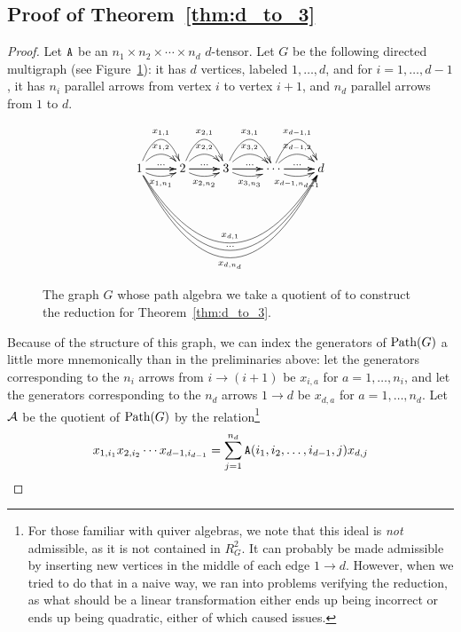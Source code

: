 \documentclass[11pt]{article}
\begin{document}
\subsection{Proof of Theorem~\ref{thm:d_to_3}}
\begin{proof}
Let $\mathtt{A}$ be an $n_1 \times n_2 \times \dotsb \times n_d$ $d$-tensor. Let $G$ be the following directed multigraph (see Figure~\ref{fig:graph}): it has $d$ vertices, labeled $1,\dotsc,d$, and for $i=1,\dotsc,d-1$, it has $n_i$ parallel arrows from vertex $i$ to vertex $i+1$, and $n_d$ parallel arrows from $1$ to $d$. 

\begin{figure}[!htbp]
\[
\xymatrix{
1 \ar[r] \ar@/^2pc/[r]^{x_{1,1}} \ar@/^1pc/[r]^{x_{1,2}} \ar[r]^{...} \ar@/_/[r]_{x_{1,n_1}}  \ar@/_5pc/[rrrr]^{x_{d,1}} \ar@/_5.5pc/[rrrr]^{...} \ar@/_6pc/[rrrr]_{x_{d,n_d}} & 
2 \ar[r] \ar@/^2pc/[r]^{x_{2,1}} \ar@/^1pc/[r]^{x_{2,2}} \ar[r]^{...} \ar@/_/[r]_{x_{2,n_2}} & 
3 \ar[r] \ar@/^2pc/[r]^{x_{3,1}} \ar@/^1pc/[r]^{x_{3,2}} \ar[r]^{...} \ar@/_/[r]_{x_{3,n_3}} & 
\dotsb \ar[r] \ar@/^2pc/[r]^{x_{d-1,1}} \ar@/^1pc/[r]^{x_{d-1,2}} \ar[r]^{...} \ar@/_/[r]_{x_{d-1,n_{d-1}}} & 
d \\
}
\]
\caption{ \label{fig:graph} The graph $G$ whose path algebra we take a quotient of to construct the reduction for Theorem~\ref{thm:d_to_3}.}
\end{figure}


Because of the structure of this graph, we can index the generators of $\text{Path}(G)$ a little more mnemonically than in the preliminaries above: let the generators corresponding to the $n_i$ arrows from $i \to (i+1)$ be $x_{i,a}$ for $a=1,\dotsc,n_i$, and let the generators corresponding to the $n_d$ arrows $1 \to d$ be $x_{d,a}$ for $a=1,\dotsc,n_d$. Let $\mathcal{A}$ be the quotient of $\text{Path}(G)$ by the relation\footnote{For those familiar with quiver algebras, we note that this ideal is \emph{not} admissible, as it is not contained in $R_G^2$. It can probably be made admissible by inserting new vertices in the middle of each edge $1 \to d$. However, when we tried to do that in a naive way, we ran into problems verifying the reduction, as what should be a linear transformation either ends up being incorrect or ends up being quadratic, either of which caused issues.}
\begin{equation}
x_{1,i_1} x_{2,i_2} \dotsb x_{d-1,i_{d-1}} = \sum_{j=1}^{n_d} \mathtt{A}(i_1, i_2, \dotsc, i_{d-1}, j) x_{d,j} \label{eq:rel_tensor}
\end{equation}


\end{proof}
\end{document}
